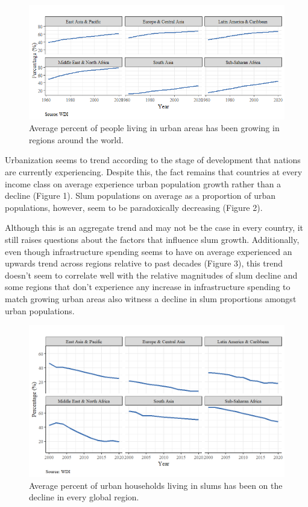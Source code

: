 \begin{figure}
    \centering
    \includegraphics[scale = 0.8]{Graphics/urbanpopPercent.png}
    \caption{Average percent of people living in urban areas has been growing in regions around the world.}
    \label{fig:Urbanpopgrowth}
\end{figure}

Urbanization seems to trend according to the stage of development that nations are currently experiencing. Despite this, the fact remains that countries at every income class on average experience urban population growth rather than a decline (Figure 1). Slum populations on average as a proportion of urban populations, however, seem to be paradoxically decreasing (Figure 2). 

Although this is an aggregate trend and may not be the case in every country, it still raises questions about the factors that influence slum growth. Additionally, even though infrastructure spending seems to have on average experienced an upwards trend across regions relative to past decades (Figure 3), this trend doesn't seem to correlate well with the relative magnitudes of slum decline and some regions that don't experience any increase in infrastructure spending to match growing urban areas also witness a decline in slum proportions amongst urban populations.

\begin{figure}
    \centering
    \includegraphics[scale = 0.8]{Graphics/Average Percent of urban households living in slums.png}
    \caption{Average percent of urban households living in slums has been on the decline in every global region.}
    \label{fig:SlumsTrend}
\end{figure}

